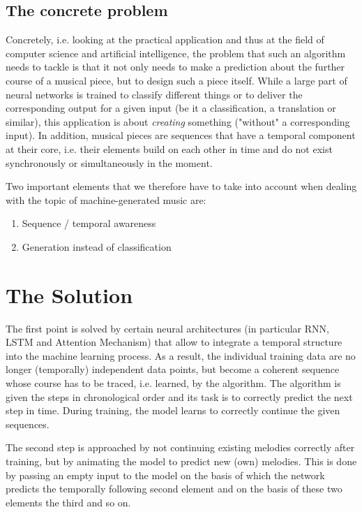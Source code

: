 \documentclass[a4paper, 10pt, xcolor=dvipsnames]{article} %
\begin{document}
\subsection{The concrete problem}

Concretely, i.e. looking at the practical application and thus at the field of
computer science and artificial intelligence, the problem that such an
algorithm needs to tackle is that it not only needs to make a prediction about
the further course of a musical piece, but to design such a piece itself. While
a large part of neural networks is trained to classify different things or to
deliver the corresponding output for a given input (be it a classification, a
translation or similar), this application is about \emph{creating} something
("without" a corresponding input). In addition, musical pieces are sequences
that have a temporal component at their core, i.e. their elements build on each
other in time and do not exist synchronously or simultaneously in the moment.

Two important elements that we therefore have to take into account when dealing
with the topic of machine-generated music are:
\begin{enumerate}
  \item Sequence / temporal awareness
  \item Generation instead of classification
\end{enumerate}


\section{The Solution}
The first point is solved by certain neural architectures (in particular RNN,
LSTM and Attention Mechanism) that allow to integrate a temporal structure into
the machine learning process. As a result, the individual training data are no
longer (temporally) independent data points, but become a coherent sequence
whose course has to be traced, i.e. learned, by the algorithm. The algorithm is
given the steps in chronological order and its task is to correctly predict the
next step in time. During training, the model learns to correctly continue the
given sequences.

The second step is approached by not continuing existing melodies correctly
after training, but by animating the model to predict new (own) melodies. This
is done by passing an empty input to the model on the basis of which the
network predicts the temporally following second element and on the basis of
these two elements the third and so on.
\end{document}
